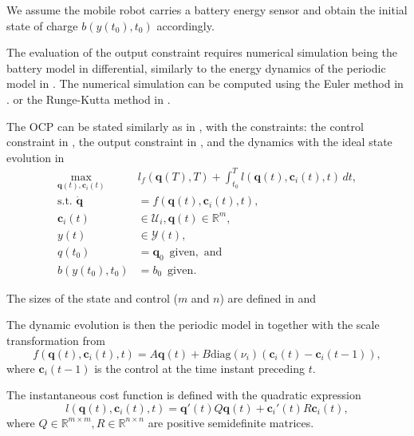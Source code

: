 We assume the mobile robot carries a battery energy sensor and obtain the initial state of charge $b(y(t_0),t_0)$ accordingly.

The evaluation of the output constraint requires numerical simulation being the battery model in  differential, similarly to the energy dynamics of the periodic model in . The numerical simulation can be computed using the Euler method in . or the Runge-Kutta method in .

The OCP can be stated similarly as in , with the constraints: the control constraint in , the output constraint in , and the dynamics with the ideal state evolution in 
\begin{subequations}\begin{align}
   \max_{\mathbf{q}(t),\mathbf{c}_i(t)}&{l_f(\mathbf{q}(T),T)+\int_{t_0}^T{l(\mathbf{q}(t),\mathbf{c}_i(t),t)\,dt}},\\
   \text{s.t. }\dot{\mathbf{q}}&=f(\mathbf{q}(t),\mathbf{c}_i(t),t),\\
   \mathbf{c}_i(t)&\in\mathcal{U}_i,\mathbf{q}(t)\in\mathbb{R}^m,\label{eq:state-cont-const-mpc}\\
   y(t)&\in\mathcal{Y}(t),\label{eq:batt-const-mpc}\\
   q(t_0)&=\mathbf{q}_0\,\,\,\text{given},\text{ and}\\
   b(y(t_0),t_0)&=b_0\,\,\,\text{given}.
\end{align}\end{subequations}

The sizes of the state and control ($m$ and $n$) are defined in  and  

The dynamic evolution is then the periodic model in  together with the scale transformation from 
\begin{equation}\label{eq:perf-model-in-mpc}
  f(\mathbf{q}(t),\mathbf{c}_i(t),t)=A\mathbf{q}(t)+B\mathrm{diag}(\nu_i)(\mathbf{c}_i(t)-\mathbf{c}_i(t-1)),
\end{equation}
where $\mathbf{c}_i(t-1)$ is the control at the time instant preceding $t$.

The instantaneous cost function is defined with the quadratic expression
\begin{equation}\label{eq:insta-cost-mpc}
  l(\mathbf{q}(t),\mathbf{c}_i(t),t)=\mathbf{q}'(t)Q\mathbf{q}(t)+\mathbf{c}_i'(t)R\mathbf{c}_i(t),
\end{equation}
where $Q\in\mathbb{R}^{m\times m},R\in\mathbb{R}^{n\times n}$ are positive semidefinite matrices.

